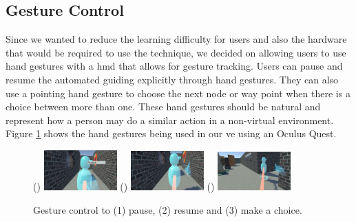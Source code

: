 \subsection{Gesture Control}
\label{subsection AGJ AJ: Gesture Control}
Since we wanted to reduce the learning difficulty for users and also the hardware that would be required to use the technique, we decided on allowing users to use hand gestures with a \acrshort{hmd} that allows for gesture tracking. Users can pause and resume the automated guiding explicitly through hand gestures. They can also use a pointing hand gesture to choose the next node or way point when there is a choice between more than one. These hand gestures should be natural and represent how a person may do a similar action in a non-virtual environment. Figure \ref{fig:automated-jumping-gestures} shows the hand gestures being used in our \acrshort{ve} using an Oculus Quest.
\begin{figure}[]
	\centering
	() {\includegraphics[width=0.25\textwidth]{images/paused-gesture.pdf}}
	() {\includegraphics[width=0.25\textwidth]{images/resume-gesture.pdf}}
	() {\includegraphics[width=0.25\textwidth]{images/choice-gesture.pdf}} 
	\caption{Gesture control to (1) pause, (2) resume and (3) make a choice.}
	\label{fig:automated-jumping-gestures}
\end{figure} 